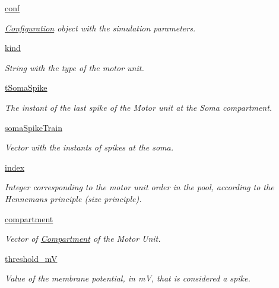 \begin{DoxyCompactItemize}
\item 
\hyperlink{class_motor_unit_1_1_motor_unit_a10539f5129881188923f3a3a164d2cba}{conf}
\begin{DoxyCompactList}\small\item\em \hyperlink{namespace_configuration}{Configuration} object with the simulation parameters. \end{DoxyCompactList}\item 
\hyperlink{class_motor_unit_1_1_motor_unit_a08ed5171ba46e0b1ea5bc7d08296c612}{kind}
\begin{DoxyCompactList}\small\item\em String with the type of the motor unit. \end{DoxyCompactList}\item 
\hyperlink{class_motor_unit_1_1_motor_unit_abca82ec2c7312bb475989bb45e82ca28}{t\+Soma\+Spike}
\begin{DoxyCompactList}\small\item\em The instant of the last spike of the Motor unit at the Soma compartment. \end{DoxyCompactList}\item 
\hyperlink{class_motor_unit_1_1_motor_unit_a8c86d98daa6c509e226ab165fa92515f}{soma\+Spike\+Train}
\begin{DoxyCompactList}\small\item\em Vector with the instants of spikes at the soma. \end{DoxyCompactList}\item 
\hyperlink{class_motor_unit_1_1_motor_unit_a4f3205a9273aabb92d425992d91a1848}{index}
\begin{DoxyCompactList}\small\item\em Integer corresponding to the motor unit order in the pool, according to the Henneman\textquotesingle{}s principle (size principle). \end{DoxyCompactList}\item 
\hyperlink{class_motor_unit_1_1_motor_unit_a6d4da7327031b3cb9c7041a4a790e524}{compartment}
\begin{DoxyCompactList}\small\item\em Vector of \hyperlink{namespace_compartment}{Compartment} of the Motor Unit. \end{DoxyCompactList}\item 
\hyperlink{class_motor_unit_1_1_motor_unit_affbd0b90f1dce6a0f929775e54f8c212}{threshold\+\_\+mV}
\begin{DoxyCompactList}\small\item\em Value of the membrane potential, in mV, that is considered a spike. \end{DoxyCompactList}\item 

\end{DoxyCompactItemize}
